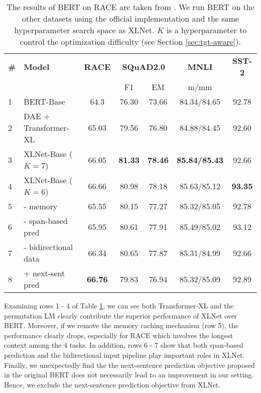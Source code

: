 \documentclass{article}
\begin{document}
\begin{table}[!h]
	\small
	\centering
	
	\begin{tabular}{ll|ccccc}
		\toprule
		\bf \# & \bf Model & \bf RACE & \multicolumn{2}{c}{\bf SQuAD2.0} & \bf MNLI & \bf SST-2 \\
		& & & F1 & EM & m/mm &   \\
		\midrule
		1 & BERT-Base                 & 64.3  & 76.30 & 73.66 & 84.34/84.65 & 92.78 \\
		2 & DAE + Transformer-XL & 65.03 & 79.56 & 76.80 & 84.88/84.45 & 92.60 \\
		3 & XLNet-Base ($K=7$)        & 66.05 & \bf 81.33 & \bf 78.46 & \bf 85.84/85.43 & 92.66 \\
4 & XLNet-Base ($K=6$)        & 66.66 & 80.98 & 78.18 & 85.63/85.12 & \bf 93.35 \\
		5 & \quad - memory             & 65.55 & 80.15 & 77.27 & 85.32/85.05 & 92.78 \\
		6 & \quad - span-based pred    & 65.95 & 80.61 & 77.91 & 85.49/85.02 & 93.12 \\
		7 & \quad - bidirectional data & 66.34 & 80.65 & 77.87 & 85.31/84.99 & 92.66 \\
		8 & \quad + next-sent pred     & \bf 66.76 & 79.83 & 76.94 & 85.32/85.09 & 92.89 \\
		\bottomrule
	\end{tabular}
	\caption{\small
		The results of BERT on RACE are taken from \cite{zhang2019dual}. We run BERT on the other datasets using the official implementation and the same hyperparameter search space as XLNet. $K$ is a hyperparameter to control the optimization difficulty (see Section \ref{sec:tgt-aware}).
	}
	\label{tab:ablation}
\end{table}

Examining rows 1 - 4 of Table \ref{tab:ablation}, we can see both Transformer-XL and the permutation LM clearly contribute the superior performance of XLNet over BERT.
Moreover, if we remove the memory caching mechanism (row 5), the performance clearly drops, especially for RACE which involves the longest context among the 4 tasks.
In addition, rows 6 - 7 show that both span-based prediction and the bidirectional input pipeline play important roles in XLNet.
Finally, we unexpectedly find the the next-sentence prediction objective proposed in the original BERT does not necessarily lead to an improvement in our setting.
Hence, we exclude the next-sentence prediction objective from XLNet.
\end{document}
